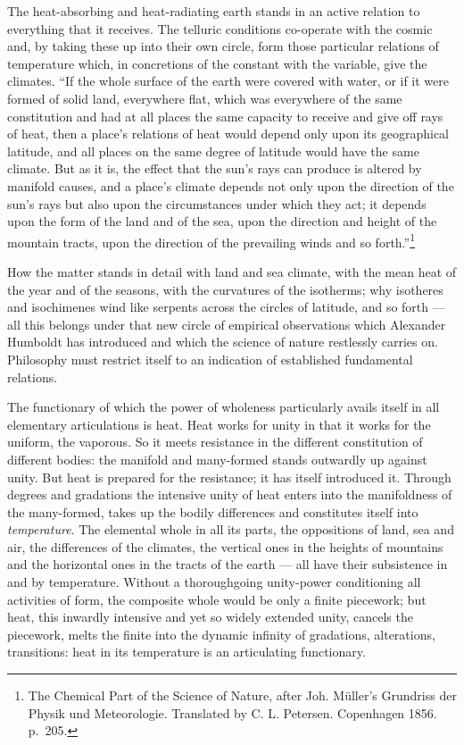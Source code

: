 \documentclass[12pt,a4paper]{book}
\begin{document}
The heat-absorbing and heat-radiating earth stands in an active relation to everything that it receives. The telluric
conditions co-operate with the cosmic and, by taking these up into their own circle, form those particular relations of
temperature which, in concretions of the constant with the variable, give the climates. ``If the whole surface of the
earth were covered with water, or if it were formed of solid land, everywhere flat, which was everywhere of the same
constitution and had at all places the same capacity to receive and give off rays of heat, then a place's relations of
heat would depend only upon its geographical latitude, and all places on the same
degree of latitude would have the same climate. But as it is, the effect that the sun's rays can produce is altered by
manifold causes, and a place's climate depends not only upon the direction of the sun's rays but also upon the
circumstances under which they act; it depends upon the form of the land and of the sea, upon the direction and height of
the mountain tracts, upon the direction of the prevailing winds and so forth.''\footnote{The Chemical Part of the Science
of Nature, after Joh. Müller's Grundriss der Physik und Meteorologie. Translated by C. L. Petersen. Copenhagen 1856.
p.\ 205.}

How the matter stands in detail with land and sea climate, with the mean heat of the year and of the seasons, with the
curvatures of the isotherms; why isotheres and isochimenes wind like serpents across the circles of latitude, and so
forth --- all this belongs under that new circle of empirical observations which Alexander Humboldt has introduced and
which the science of nature restlessly carries on. Philosophy must restrict itself to an indication of established
fundamental relations.

The functionary of which the power of wholeness particularly avails itself in all elementary articulations is heat. Heat
works for unity in that it works for the uniform, the vaporous. So it meets resistance in the different constitution of
different bodies: the manifold and many-formed stands outwardly up against unity. But heat is prepared for the
resistance; it has itself introduced it. Through degrees and gradations the intensive unity of heat enters into the
manifoldness of the many-formed, takes up the bodily differences and constitutes itself into \emph{temperature}. The
elemental whole in all its parts, the oppositions of land, sea and air, the differences of the climates, the vertical
ones in the heights of mountains and the horizontal ones in the tracts of the earth --- all have their subsistence in and
by temperature. Without a thoroughgoing unity-power conditioning all
activities of form, the composite whole would be only a finite piecework; but heat, this inwardly intensive and yet so
widely extended unity, cancels the piecework, melts the finite into the dynamic infinity of gradations, alterations,
transitions: heat in its temperature is an articulating functionary.
\end{document}
